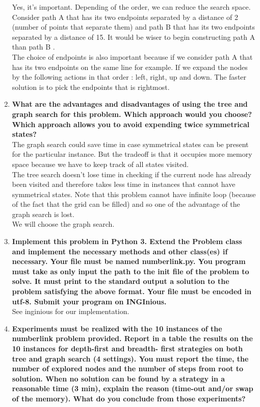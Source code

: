 \documentclass[10pt,a4paper]{article}
\begin{document}
\begin{enumerate}
	Yes, it's important. Depending of the order, we can reduce the search space. Consider path A that has its two endpoints separated by a distance of 2 (number of points that separate them) and path B that has its two endpoints separated by a distance of 15. It would be wiser to begin constructing path A than path B .\\
	
	The choice of endpoints is also important because if we consider path A that has its two endpoints on the same line for example. If we expand the nodes by the following actions in that order : left, right, up and down. The faster solution is to pick the endpoints that is rightmost.\\
	
	
	\item \textbf{What are the advantages and disadvantages of using the tree and graph search for this problem. Which approach would you choose? Which approach allows you to avoid expending twice symmetrical states?} \\
	
	The graph search could save time in case symmetrical states can be present for the particular instance. But the tradeoff  is that it occupies more memory space because we have to keep track of all states visited.\\
	
	The tree search doesn't lose time in checking if the current node has already been visited and therefore takes less time in instances that cannot have symmetrical states. Note that this problem cannot have infinite loop (because of the fact that the grid can be filled) and so one of the advantage of the graph search is lost. \\
	
	We will choose the graph search.
	
	\item \textbf{Implement this problem in Python 3. Extend the Problem class and implement the necessary methods and other class(es) if necessary. Your file must be named numberlink.py. You program must take as only input the path to the init file of the problem to solve. It must print to the standard output a solution to the problem satisfying the above format. Your file must be encoded in utf-8. Submit your program on INGInious.} \\
	
	See inginious for our implementation.\\
	
	\item \textbf{Experiments must be realized with the 10 instances of the numberlink problem provided. Report in a table the results on the 10 instances for depth-first and breadth- first strategies on both tree and graph search (4 settings). You must report the time, the number of explored nodes and the number of steps from root to solution. When no solution can be found by a strategy in a reasonable time (3 min), explain the reason (time-out and/or swap of the memory). What do you conclude from those experiments?} \\
	

\end{enumerate}
\end{document}
